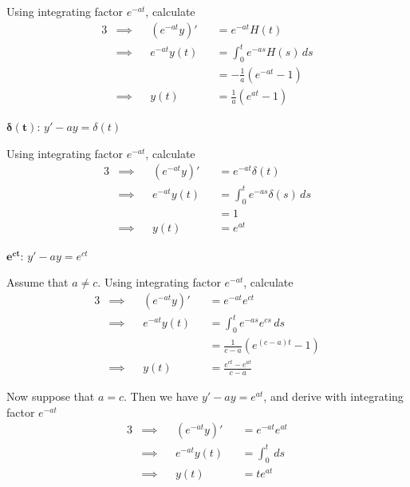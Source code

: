\documentclass[a4paper]{article}
\begin{document}
Using integrating factor \(e^{-at}\), calculate
\begin{alignat*}{3}
	&\implies && \!\left( e^{-at}y \right)' && = e^{-at} H \!\left( t \right)   \\
	&\implies && e^{-at} y \!\left( t \right) && = \int^{t}_{0} e^{-as} H \!\left( s \right)  \, ds  \\ 
	& && && = -\frac{1}{a} \!\left( e^{-at} - 1 \right) \\
	&\implies && y \!\left( t \right) && = \boxed{ \frac{1}{a} \!\left( e^{at} - 1 \right) }
\end{alignat*}

\(\bm{\delta \!\left( t \right) }\): \(y' - ay = \delta \!\left( t \right) \)

Using integrating factor \(e^{-at}\), calculate
\begin{alignat*}{3}
	&\implies && \!\left( e^{-at}y \right)' && = e^{-at} \delta \!\left( t \right)  \\
	&\implies && e^{-at} y \!\left( t \right) && = \int^{t}_{0} e^{-as} \delta \!\left( s \right)  \, ds   \\ 
	& && && = 1 \\
	&\implies && y \!\left( t \right) && = \boxed{ e^{at} }
\end{alignat*}

\(\bm{e^{ct}}\): \(y' - ay = e^{ct}\)

Assume that \(a \neq c\). Using integrating factor \(e^{-at}\), calculate
\begin{alignat*}{3}
	&\implies && \!\left( e^{-at}y \right)' && = e^{-at} e^{ct} \\
	&\implies && e^{-at} y \!\left( t \right) && = \int^{t}_{0} e^{-as} e^{cs} \, ds   \\ 
	& && && = \frac{1}{c - a} \!\left( e^{\!\left( c - a \right) t}- 1 \right) \\
	&\implies && y \!\left( t \right) && = \boxed{\frac{e^{ct} - e^{at}}{c - a}}
\end{alignat*}

Now suppose that \(a = c\). Then we have \(y' - ay = e^{at}\), and derive with integrating factor \(e^{-at}\)
\begin{alignat*}{3}
	&\implies && \!\left( e^{-at}y \right)' && = e^{-at} e^{at} \\
	&\implies && e^{-at} y \!\left( t \right) && = \int^{t}_{0}  \, ds   \\
	&\implies && y \!\left( t \right) && = \boxed{ te^{at} }
\end{alignat*}
\end{document}
